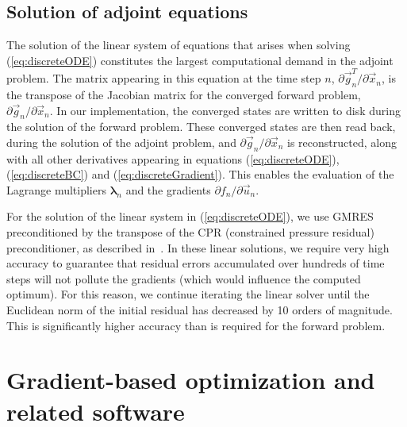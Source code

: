 \documentclass[twocolumn,numbook]{svjour3}          %
\def\u{{\vec u}}
\def\x{{\vec x}}
\def\p{{\vec{g}}}
\def\blambda{{\pmb{\lambda}}}%
\begin{document}




\subsection{Solution of adjoint equations} The solution of the linear system of
equations that arises when solving (\ref{eq:discreteODE}) constitutes the
largest computational demand in the adjoint problem. The matrix appearing in
this equation at the time step $n$, $\partial {\p_n^T}/\partial {\x_n}$, is
the transpose of the Jacobian matrix for the converged forward problem,
    $\partial {\p_n}/\partial {\x_n}$. In our implementation, the converged
    states are written to disk during the solution of the forward problem. These
converged states are then read back, during the solution of the adjoint problem,
          and $\partial {\p_n}/\partial {\x_n}$ is reconstructed, along with all
other derivatives appearing in equations (\ref{eq:discreteODE}),
      (\ref{eq:discreteBC}) and (\ref{eq:discreteGradient}). This enables the
      evaluation of the Lagrange multipliers $\blambda_n$ and the gradients
      $\partial f_n/\partial {\u_n}$.


For the solution of the linear system in (\ref{eq:discreteODE}), we use
GMRES preconditioned by the transpose of the CPR (constrained
pressure residual) preconditioner, as described in~\cite{CPRA}. In these
linear solutions, we require very high accuracy to guarantee that residual
errors accumulated over hundreds of time steps will not pollute the gradients
(which would influence the computed optimum). For this reason, we continue
iterating the linear solver until the Euclidean norm of the initial residual has
decreased by 10 orders of magnitude. This is significantly higher accuracy than
is required for the forward problem.




\section{Gradient-based optimization and related software}
\label{sec:SQPSNOPT}
\end{document}
